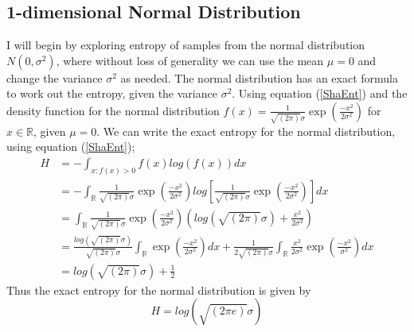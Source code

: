 \documentclass{article}
\begin{document}
\subsection{1-dimensional Normal Distribution} \label{Normal_d=1}
I will begin by exploring entropy of samples from the normal distribution $N(0, \sigma^2)$, where without loss of generality we can use the mean $\mu = 0$ and change the variance $\sigma^2$ as needed. The normal distribution has an exact formula to work out the entropy, given the variance $\sigma^2$. Using equation (\ref{ShaEnt}) and the density function for the normal distribution $f(x) = \frac{1}{\sqrt{(2\pi)} \sigma}\exp{ \left( \frac{-x^2}{2\sigma^2} \right)}$ for $x \in \mathbb{R}$, given $\mu = 0$. We can write the exact entropy for the normal distribution, using equation (\ref{ShaEnt});
\begin{align}
H &= - \int_{x : f(x) > 0} f(x) log(f(x)) dx \nonumber \\
&= - \int_{\mathbb{R}} \frac{1}{\sqrt{(2\pi)} \sigma}\exp{ \left( \frac{-x^2}{2\sigma^2} \right)} log \left[\frac{1}{\sqrt{(2\pi)} \sigma}\exp{ \left( \frac{-x^2}{2\sigma^2} \right)} \right] dx \nonumber \\
&=  \int_{\mathbb{R}} \frac{1}{\sqrt{(2\pi)} \sigma}\exp{ \left( \frac{-x^2}{2\sigma^2} \right)} \left( log(\sqrt{(2\pi)}\sigma) +  \frac{x^2}{2\sigma^2} \right) \nonumber \\
&= \frac{log(\sqrt{(2\pi)}\sigma)}{\sqrt{(2\pi)} \sigma} \int_{\mathbb{R}} \exp{ \left( \frac{-x^2}{2\sigma^2} \right)} dx +  \frac{1}{2\sqrt{(2\pi)} \sigma} \int_{\mathbb{R}} \frac{x^2}{2\sigma^2}  \exp{ \left( \frac{-x^2}{\sigma^2} \right)} dx \nonumber \\
&=  log(\sqrt{(2\pi)}\sigma) + \frac{1}{2} \nonumber 
\end{align}
Thus the exact entropy for the normal distribution is given by 
\begin{equation}\label{NormalEnt}
H =  log(\sqrt{(2\pi e)}\sigma) 
\end{equation}
\end{document}
